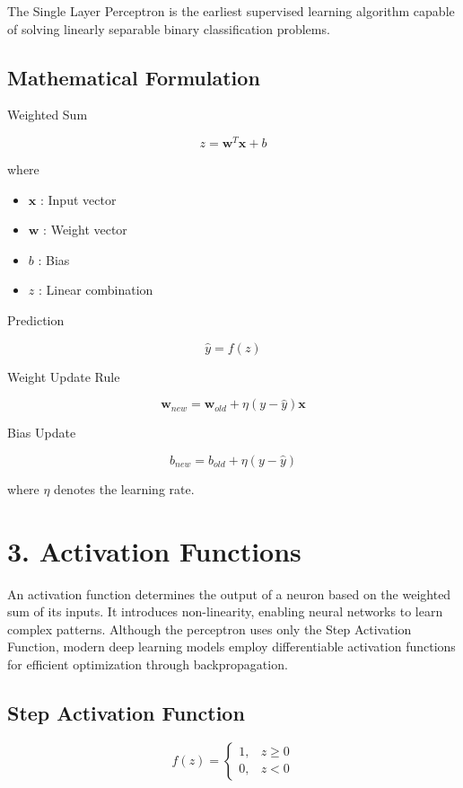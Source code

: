 \documentclass[11pt]{article}
\begin{document}
The Single Layer Perceptron is the earliest supervised learning algorithm capable of solving linearly separable binary classification problems.

\subsection*{Mathematical Formulation}

Weighted Sum

\[
z=\mathbf{w}^{T}\mathbf{x}+b
\]

where

\begin{itemize}
\item $\mathbf{x}$ : Input vector
\item $\mathbf{w}$ : Weight vector
\item $b$ : Bias
\item $z$ : Linear combination
\end{itemize}

Prediction

\[
\hat y=f(z)
\]

Weight Update Rule

\[
\mathbf{w}_{new}
=
\mathbf{w}_{old}
+
\eta
(y-\hat y)
\mathbf{x}
\]

Bias Update

\[
b_{new}
=
b_{old}
+
\eta
(y-\hat y)
\]

where $\eta$ denotes the learning rate.


\section*{3. Activation Functions}

An activation function determines the output of a neuron based on the weighted sum of its inputs. It introduces non-linearity, enabling neural networks to learn complex patterns. Although the perceptron uses only the Step Activation Function, modern deep learning models employ differentiable activation functions for efficient optimization through backpropagation.

\subsection*{Step Activation Function}

\[
f(z)=
\begin{cases}
1,&z\ge0\\
0,&z<0
\end{cases}
\]
\end{document}
